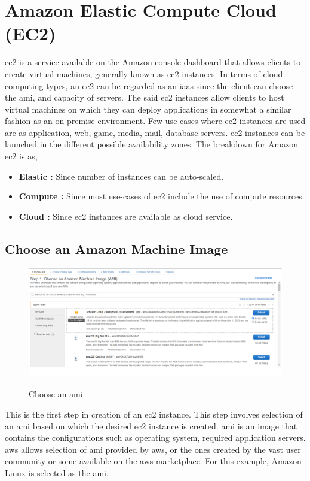 \documentclass{home_assignment}
\begin{document}
\section{Amazon Elastic Compute Cloud (EC2)} 
\acrfull{ec2} is a service available on the Amazon console dashboard that allows clients to create virtual machines, generally known as \acrshort{ec2} instances. In terms of cloud computing types, an \acrshort{ec2} can be regarded as an \acrshort{iaas} since the client can choose the \acrshort{ami}, and capacity of servers. The said \acrshort{ec2} instances allow clients to host virtual machines on which they can deploy applications in somewhat a similar fashion as an on-premise environment. Few use-cases where \acrshort{ec2} instances are used are as application, web, game, media, mail, database servers. \acrshort{ec2} instances can be launched in the different possible availability zones. The breakdown for Amazon \acrshort{ec2} is as,
\begin{itemize}
    \item \textbf{Elastic :} Since number of instances can be auto-scaled.
    \item \textbf{Compute :} Since most use-cases of \acrshort{ec2} include the use of compute resources.
    \item \textbf{Cloud :} Since \acrshort{ec2} instances are available as cloud service.
\end{itemize}


\subsection{Choose an Amazon Machine Image}
\begin{figure}[H]
    \centering
    \includegraphics[frame,width=\linewidth]{../Figures/a.png}
    \label{fig:a}
    \caption{Choose an \acrlong{ami}}
\end{figure}
This is the first step in creation of an \acrshort{ec2} instance. This step involves selection of an \acrshort{ami} based on which the desired \acrshort{ec2} instance is created. \acrfull{ami} is an image that contains the configurations such as operating system, required application servers. \acrshort{aws} allows selection of \acrshort{ami} provided by \acrshort{aws}, or the ones created by the vast user community or some available on the \acrshort{aws} marketplace. For this example, Amazon Linux is selected as the \acrshort{ami}.
\end{document}
